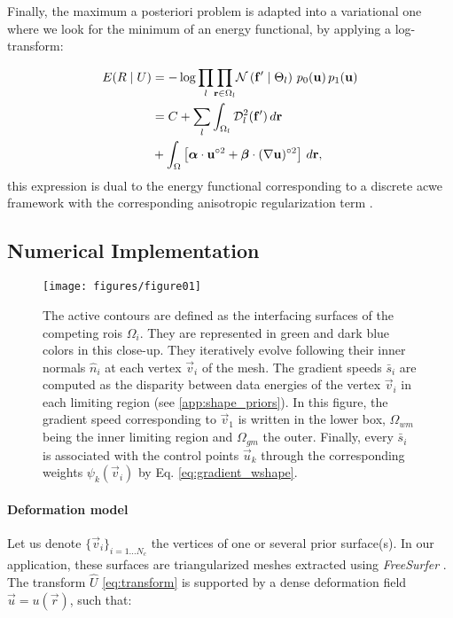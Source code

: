 Finally, the maximum a posteriori problem is adapted into a variational one where we look for
  the minimum of an energy functional, by applying a log-transform:

  \begin{align}
  E(R \mid U) &= -\log \underset{l}{\prod}
  \underset{\vec{r} \in \Omega_l}{\prod}
  \mathcal{N} \left( \vec{f}' \mid \Theta_l \right)\,p_0( \vec{u})\,p_1( \vec{u}) \notag\\
  &= C + \underset{l}{\sum} \int_{\Omega_l}
  \mdist{f'}{l} \,d\vec{r} \notag\\
  &+ \int_{\Omega} \left[ \boldsymbol{\alpha} \cdot \vec{u}^{\circ2}
  + \boldsymbol{\beta} \cdot (\nabla \vec{u})^{\circ2} \right] \,d\vec{r},
  \label{eq:energy}
  \end{align}
%
  this expression is dual to the energy functional corresponding
  to a discrete \gls*{acwe} framework \citep{chan_active_2001}
  with the corresponding anisotropic regularization term \citep{nagel_investigation_1986}.


\subsection{Numerical Implementation}
\label{sec:numerical_implementation}

\begin{figure}
	\texttt{[image: figures/figure01]}
	\caption{The active contours are defined as the interfacing surfaces of the competing
	  \glspl{roi} $\Omega_i$.
	They are represented in green and dark blue colors in this close-up.
	They iteratively evolve following their inner normals $\hat{n}_i$ at each vertex
	  $\vec{v}_i$ of the mesh.
	The gradient speeds $\bar{s}_i$ are computed as the disparity between data energies of
	  the vertex $\vec{v}_i$ in each limiting region (see \ref{app:shape_priors}).
	In this figure, the gradient speed corresponding to $\vec{v}_1$ is written in the lower
	  box, $\Omega_{wm}$ being the inner limiting region and $\Omega_{gm}$ the outer.
	Finally, every $\bar{s}_i$ is associated with the control points $\vec{u}_k$ through
	  the corresponding weights $\psi_k(\vec{v}_i)$ by Eq. \eqref{eq:gradient_wshape}.
	}\label{fig:method}
\end{figure}

\paragraph*{Deformation model}\label{sec:deformation_model}
Let us denote $\{\vec{v}_i\}_{i=1 \ldots N_c}$ the vertices of one or several prior
  surface(s).
In our application, these surfaces are triangularized meshes extracted using \emph{FreeSurfer}
  \citep{fischl_freesurfer_2012}.
The transform $\hat{U}$ \eqref{eq:transform} is supported by a dense deformation field
  $\vec{u} = u(\vec{r})$, such that:

